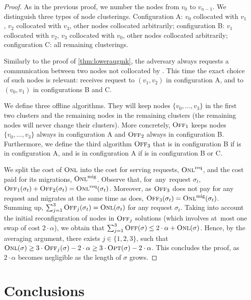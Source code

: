 \begin{proof} As in the previous proof, we number the nodes from $v_0$ to
$v_{n-1}$. We distinguish three types of node clusterings. Configuration A:
$v_0$ collocated with $v_1$, $v_2$ collocated with $v_3$, other nodes
collocated arbitrarily; configuration B: $v_1$ collocated with $v_2$, $v_3$
collocated with $v_0$, other nodes collocated arbitrarily; configuration C:
all remaining clusterings.

Similarly to the proof of \ref{thm:loweraugmk}, the adversary always
requests a communication between two nodes not collocated by \ONL.
This time the exact choice of such nodes is relevant: \ONL receives request to
$(v_1,v_2)$ in configuration A, and to $(v_0,v_1)$ in configurations B and C.

We define three offline algorithms. They will keep nodes
$\{v_0,\ldots,v_3\}$ in the first two clusters and the remaining nodes in the
remaining clusters (the remaining nodes will never change their clusters). 
More concretely, $\textsc{Off}_1$ keeps nodes $\{v_0,\ldots,v_3\}$ always in
configuration A and $\textsc{Off}_2$ always in configuration B. Furthermore, we define
the third algorithm $\textsc{Off}_3$ that is in configuration B if \ONL is in
configuration A, and is in configuration A if \ONL is in configuration B or C.

We split the cost of $\textsc{Onl}$ into the cost for serving requests, $\textsc{Onl}^\textnormal{req}$, and
the cost paid for its migrations, $\textsc{Onl}^\textnormal{mig}$. Observe that, for~any~request
$\sigma_t$, $\textsc{Off}_1(\sigma_t) + \textsc{Off}_2(\sigma_t) = \textsc{Onl}^\textnormal{req}(\sigma_t)$.
Moreover, as $\textsc{Off}_3$ does not pay for any request and migrates at the same
time as \ONL does, $\textsc{Off}_3(\sigma_t) = \textsc{Onl}^\textnormal{mig}(\sigma_t)$. Summing up,
$\sum_{j=1}^3 \textsc{Off}_j(\sigma_t) = \textsc{Onl}(\sigma_t)$ for any request $\sigma_t$.
Taking into account the initial reconfiguration of nodes in $\textsc{Off}_j$ solutions
(which involves at~most one swap of cost $2 \cdot \alpha$), we obtain that
$\sum_{j=1}^3 \textsc{Off}(\sigma) \leq 2 \cdot \alpha + \textsc{Onl}(\sigma)$. Hence, by the
averaging argument, there exists $j \in \{1,2,3\}$, such that $\textsc{Onl}(\sigma)
\geq 3 \cdot \textsc{Off}_j(\sigma) - 2 \cdot \alpha \geq 3 \cdot \textsc{Opt}(\sigma) - 
2 \cdot \alpha$. This concludes the proof, as $2 \cdot \alpha$ becomes
negligible as the length of $\sigma$ grows.
\end{proof}

\section{Conclusions}\label{sec:conclusion-dynamic}

